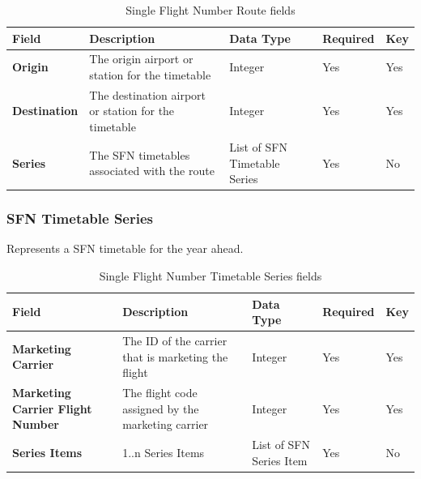 \begin{table}[H]
\centering
\begin{tabular}{|p{2.5cm}|p{4cm}|p{2.5cm}|p{2cm}|p{1.2cm}|}
\hline
\textbf{Field}       & \textbf{Description}                                 & \textbf{Data Type}           & \textbf{Required} & \textbf{Key} \\ \hline
\textbf{Origin}      & The origin airport or station for the timetable      & Integer                      & Yes               & Yes          \\ \hline
\textbf{Destination} & The destination airport or station for the timetable & Integer                      & Yes               & Yes          \\ \hline
\textbf{Series}      & The SFN timetables associated with the route         & List of SFN Timetable Series & Yes               & No           \\ \hline
\end{tabular}
\caption{Single Flight Number Route fields}
\label{sfn-route}
\end{table}

\subsubsection*{SFN Timetable Series}

Represents a SFN timetable for the year ahead.

\begin{table}[H]
\centering
\begin{tabular}{|p{2.5cm}|p{4cm}|p{2.5cm}|p{2cm}|p{1.2cm}|}
\hline
\textbf{Field}                           & \textbf{Description}                               & \textbf{Data Type}      & \textbf{Required} & \textbf{Key} \\ \hline
\textbf{Marketing Carrier}               & The ID of the carrier that is marketing the flight & Integer                 & Yes               & Yes          \\ \hline
\textbf{Marketing Carrier Flight Number} & The flight code assigned by the marketing carrier  & Integer                 & Yes               & Yes          \\ \hline
\textbf{Series Items}                    & 1..n Series Items                                  & List of SFN Series Item & Yes               & No           \\ \hline
\end{tabular}
\caption{Single Flight Number Timetable Series fields}
\label{sfn-series}
\end{table}

